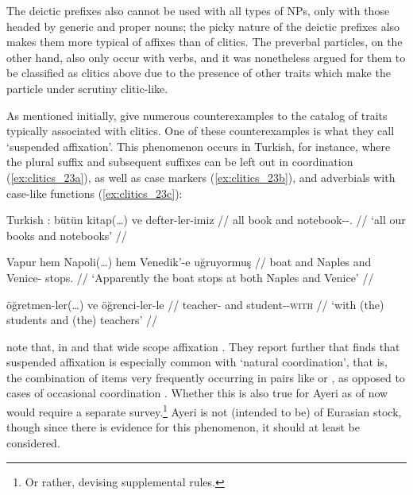 The deictic prefixes also cannot be used with all types of NPs, only with those
headed by generic and proper nouns; the picky nature of the deictic prefixes
also makes them more typical of affixes than of clitics. The preverbal
particles, on the other hand, also only occur with verbs, and it was
nonetheless argued for them to be classified as clitics above due to the
presence of other traits which make the particle under scrutiny clitic-like.

As mentioned initially, \citet{spencerluis2012} give numerous counterexamples
to the catalog of traits typically associated with clitics. One of these
counterexamples is what they call `suspended affixation'. This phenomenon
occurs in Turkish, for instance, where the plural suffix  and
subsequent suffixes can be left out in coordination (\ref{ex:clitics_23a}), as
well as case markers (\ref{ex:clitics_23b}), and adverbials with case-like
functions (\ref{ex:clitics_23c}):

\pex\label{ex:clitics_23}
Turkish \citep[199]{spencerluis2012}:
\a\label{ex:clitics_23a}\begingl
	\gla bütün kitap(…) ve defter-ler-imiz //
	\glb all book and notebook-\Pl{}-\Fpl{}.\Poss{} //
	\glft `all our books and notebooks' //
\endgl

\a\label{ex:clitics_23b}\begingl
	\gla Vapur hem Napoli(…) hem Venedik'-e uğruyormuş //
	\glb boat and Naples and Venice-\Loc{} stops.\Evid{} //
	\glft `Apparently the boat stops at both Naples and Venice' //
\endgl

\a\label{ex:clitics_23c}\begingl
	\gla öğretmen-ler(…) ve öğrenci-ler-le //
	\glb teacher-\Pl{} and student-\Pl{}-\textsc{with} //
	\glft `with (the) students and (the) teachers' //
\endgl
\xe

\citet{spencerluis2012} note that, in  and that wide scope affixation . They report further that \citet{wälchli2005} finds
that suspended affixation is especially common with `natural coordination',
that is, the combination of items very frequently occurring in pairs like
 or , as opposed to cases of
occasional coordination \citep[200]{spencerluis2012}. Whether this is also true
for Ayeri as of now would require a separate survey.\footnote{Or rather,
devising supplemental rules.} Ayeri is not (intended to be) of Eurasian stock,
though since there is evidence for this phenomenon, it should at least be
considered.


